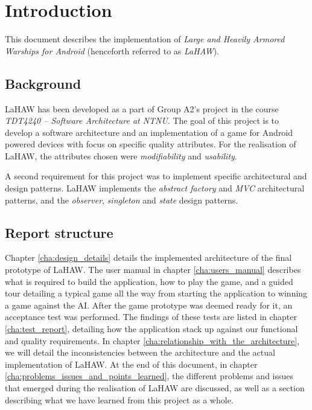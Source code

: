 \chapter{Introduction}

This document describes the implementation of \emph{Large and Heavily Armored Warships for Android} (henceforth referred to as \emph{LaHAW}). 




\section{Background}

LaHAW has been developed as a part of Group A2's project in the course \emph{TDT4240 – Software Architecture at NTNU}. The goal of this project is to develop a software architecture and an implementation of a game for Android powered devices with focus on specific quality attributes. For the realisation of LaHAW, the attributes chosen were \emph{modifiability} and \emph{usability}.

A second requirement for this project was to implement specific architectural and design patterns. LaHAW implements the \emph{abstract factory} and \emph{MVC} architectural patterns, and the \emph{observer}, \emph{singleton} and \emph{state} design patterns.



\section{Report structure}

Chapter \ref{cha:design_details} details the implemented architecture of the final prototype of LaHAW.
The user manual in chapter \ref{cha:users_manual} describes what is required to build the application, how to play the game, and a guided tour detailing a typical game all the way from starting the application to winning a game against the AI.
After the game prototype was deemed ready for it, an acceptance test was performed. The findings of these tests are listed in chapter \ref{cha:test_report}, detailing how the application stack up against our functional and quality requirements.
In chapter \ref{cha:relationship_with_the_architecture}, we will detail the inconsistencies between the architecture and the actual implementation of LaHAW.
At the end of this document, in chapter \ref{cha:problems_issues_and_points_learned}, the different problems and issues that emerged during the realisation of LaHAW are discussed, as well as a section describing what we have learned from this project as a whole.